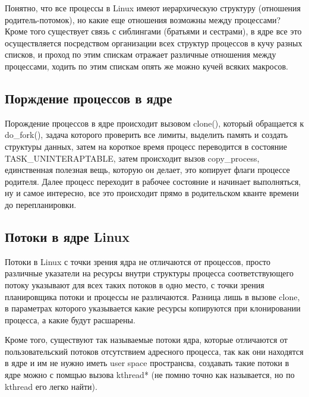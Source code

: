Понятно, что все процессы в Linux имеют иерархическую структуру (отношения родитель-потомок), но какие еще отношения возможны между процессами? Кроме того
существует связь с сиблингами (братьями и сестрами), в ядре все это осуществляется посредством организации всех структур процессов в кучу разных списков, и проход
по этим спискам отражает различные отношения между процессами, ходить по этим спискам опять же можно кучей всяких макросов.

\subsection{Порждение процессов в ядре}

Порождение процессов в ядре происходит вызовом clone(), который обращается к do\_fork(), задача которого проверить все лимиты, выделить память и создать структуры
данных, затем на короткое время процесс переводится в состояние TASK\_UNINTERAPTABLE, затем происходит вызов copy\_process, единственная полезная вещь, которую он
делает, это копирует флаги процессе родителя. Далее процесс переходит в рабочее состояние и начинает выполняться, ну и самое интересно, все это происходит прямо
в родительском кванте времени до перепланировки.

\subsection{Потоки в ядре Linux}

Потоки в Linux с точки зрения ядра не отличаются от процессов, просто различные указатели на ресурсы внутри структуры процесса соответствующего потоку указывают
для всех таких потоков в одно место, с точки зрения планировщика потоки и процессы не различаются. Разница лишь в вызове clone, в параметрах которого указывается
какие ресурсы копируются при клонировании процесса, а какие будут расшарены.

Кроме того, существуют так называемые потоки ядра, которые отличаются от пользовательский потоков отсутствием адресного процесса, так как они находятся в ядре и им
не нужно иметь user space пространсва, создавать такие потоки в ядре можно с помщью вызова kthread* (не помню точно как называется, но по kthread его легко найти).